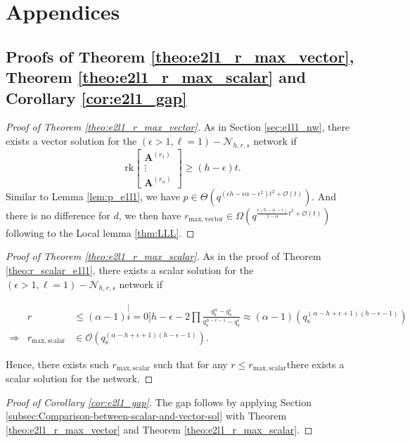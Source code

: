 \chapter{Appendices} \label{chap:appendix}

\section{Proofs of Theorem \ref{theo:e2l1_r_max_vector}, Theorem \ref{theo:e2l1_r_max_scalar}
and Corollary \ref{cor:e2l1_gap} \label{app:proofs_e2l1}}
\begin{proof}[Proof of Theorem \vref{theo:e2l1_r_max_vector}]
 As in Section \vref{sec:e1l1_nw}, there exists a vector solution
for the $\left(\epsilon>1,\ell=1\right)-\mathcal{N}_{h,r,s}$ network
if
\[
\mathrm{rk}\left[\begin{array}{c}
\boldsymbol{A}^{\left(r_{1}\right)}\\
\vdots\\
\boldsymbol{A}^{\left(r_{\alpha}\right)}
\end{array}\right]\geq\left(h-\epsilon\right)t.
\]
Similar to Lemma \ref{lem:p_e1l1}, we have $p\in\Theta\left(q^{\left(\epsilon h-\epsilon\alpha-\epsilon^{2}\right)t^{2}+\mathcal{O}(t)}\right)$.
And there is no difference for $d$, we then have $r_{\mathrm{max,vector}}\in\Omega\left(q^{\frac{\epsilon\left(h-\alpha-\epsilon\right)}{1-\alpha}t^{2}+\mathcal{O}(t)}\right)$
following to the Local lemma \ref{thm:LLL}.
\end{proof}
%
\begin{proof}[Proof of Theorem \vref{theo:e2l1_r_max_scalar}]
 As in the proof of Theorem \ref{theo:r_scalar_e1l1}, there exists
a scalar solution for the $\left(\epsilon>1,\ell=1\right)-\mathcal{N}_{h,r,s}$
network if

\begin{eqnarray*}
 & r & \leq\left(\alpha-1\right)\stackrel[i=0]{h-\epsilon-2}{\prod}\frac{q_{\mathrm{s}}^{\alpha}-q_{\mathrm{s}}^{i}}{q_{\mathrm{s}}^{h-\epsilon-1}-q_{\mathrm{s}}^{i}}\approx\left(\alpha-1\right)\left(q_{\mathrm{s}}^{\left(\alpha-h+\epsilon+1\right)\left(h-\epsilon-1\right)}\right)\\
\Rightarrow & r_{\mathrm{max,scalar}} & \in\mathcal{O}\left(q_{\mathrm{s}}^{\left(\alpha-h+\epsilon+1\right)\left(h-\epsilon-1\right)}\right).
\end{eqnarray*}

Hence, there exists such $r_{\mathrm{max,scalar}}$ such that for
any $r\leq r_{\mathrm{max,scalar}}$there exists a scalar solution
for the network.
\end{proof}
%
\begin{proof}[Proof of Corollary \vref{cor:e2l1_gap}]
 The gap follows by applying Section \ref{subsec:Comparison-between-scalar-and-vector-sol}
with Theorem \vref{theo:e2l1_r_max_vector} and Theorem \vref{theo:e2l1_r_max_scalar}.
\end{proof}

